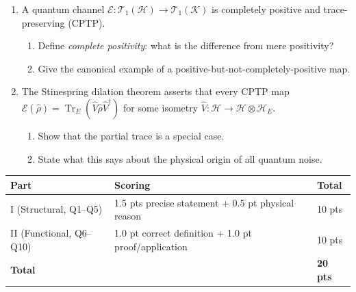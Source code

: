 \documentclass[11pt,a4paper]{article}
\begin{document}
\begin{tcolorbox}[gradconceptbox, title={Part II --- Functional-Analytic Probes \hfill\normalfont 5 $\times$ 2 pts = 10 pts}]
\begin{enumerate}[leftmargin=1.8em, label=\textbf{Q\arabic*.}, itemsep=10pt, start=6]
\item {}
  A quantum channel $\mathcal{E}:\mathcal{T}_1(\mathcal{H})\to\mathcal{T}_1(\mathcal{K})$
  is completely positive and trace-preserving (CPTP).
  \begin{enumerate}[label=(\alph*)]
    \item Define \emph{complete positivity}: what is the difference from mere positivity?
    \item Give the canonical example of a positive-but-not-completely-positive map.
  \end{enumerate}

  \vspace{2.5cm}

\item {}
  The Stinespring dilation theorem asserts that every CPTP map
  $\mathcal{E}(\hat{\rho})=\operatorname{Tr}_E(\hat{V}\hat{\rho}\hat{V}^\dagger)$
  for some isometry $\hat{V}:\mathcal{H}\to\mathcal{H}\otimes\mathcal{H}_E$.
  \begin{enumerate}[label=(\alph*)]
    \item Show that the partial trace is a special case.
    \item State what this says about the physical origin of all quantum noise.
  \end{enumerate}

  \vspace{2.5cm}

\end{enumerate}
\end{tcolorbox}

\begin{tcolorbox}[rubricbox, title={SCQG Rubric}]
\begin{tabular}{lll}
\toprule
Part & Scoring & Total\\
\midrule
I (Structural, Q1--Q5) & 1.5 pts precise statement + 0.5 pt physical reason & 10 pts\\
II (Functional, Q6--Q10) & 1.0 pt correct definition + 1.0 pt proof/application & 10 pts\\
\midrule
\textbf{Total} & & \textbf{20 pts}\\
\bottomrule
\end{tabular}
\end{tcolorbox}
\end{document}
